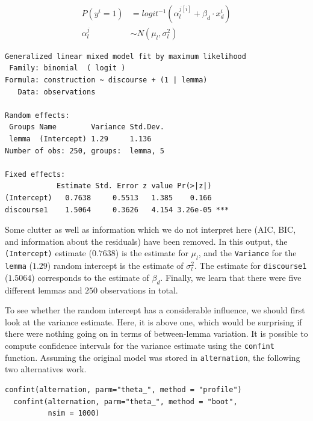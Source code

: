 \documentclass[a4paper,12pt]{article}
\begin{document}
\begin{align}
  P(y^i=1) & = logit^{-1}(\alpha_{l}^{j[i]}+\beta_d\cdot x_d^i)
  \label{eq:glmm01r} \\
  \alpha_l^j & \sim N(\mu_l,\sigma_l^2)
  \label{eq:glmm02r}
\end{align}

\vspace{0.5\baselineskip}

\begin{lstlisting}[frame=trbl]
Generalized linear mixed model fit by maximum likelihood 
 Family: binomial  ( logit )
Formula: construction ~ discourse + (1 | lemma)
   Data: observations

Random effects:
 Groups Name        Variance Std.Dev.
 lemma  (Intercept) 1.29     1.136   
Number of obs: 250, groups:  lemma, 5

Fixed effects:
            Estimate Std. Error z value Pr(>|z|)    
(Intercept)   0.7638     0.5513   1.385    0.166    
discourse1    1.5064     0.3626   4.154 3.26e-05 ***
\end{lstlisting}

Some clutter as well as information which we do not interpret here (AIC, BIC, and information about the residuals) have been removed.
In this output, the \texttt{(Intercept)} estimate ($0.7638$) is the estimate for $\mu_l$, and the \texttt{Variance} for the \texttt{lemma} ($1.29$) random intercept is the estimate of $\sigma_l^2$.
The estimate for \texttt{discourse1} ($1.5064$) corresponds to the estimate of $\beta_d$.
Finally, we learn that there were five different lemmas and $250$ observations in total.

To see whether the random intercept has a considerable influence, we should first look at the variance estimate.
Here, it is above one, which would be surprising if there were nothing going on in terms of between-lemma variation.
It is possible to compute confidence intervals for the variance estimate using the \texttt{confint} function.
Assuming the original model was stored in \texttt{alternation}, the following two alternatives work.

\vspace{0.5\baselineskip}

\begin{lstlisting}[frame=trbl]
  confint(alternation, parm="theta_", method = "profile")
  confint(alternation, parm="theta_", method = "boot",
          nsim = 1000)
\end{lstlisting}
\end{document}
